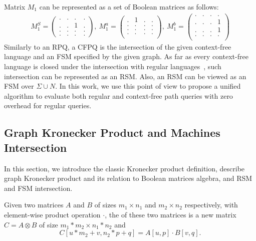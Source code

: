 Matrix $M_1$ can be represented as a set of Boolean matrices as follows:
{\small
\begin{align*}
M_1^S =
\begin{pmatrix}
    . & . & . & .   \\
    . & . & 1 & .   \\
    . & . & . & .   \\
    . & . & . & .
\end{pmatrix},~M_1^a =
\begin{pmatrix}
   . & 1 & . & .   \\
   . & . & . & .   \\
   . & . & . & .   \\
   . & . & . & .   \\
\end{pmatrix},~M_1^b =
\begin{pmatrix}
    . & . & . & .   \\
    . & . & . & 1   \\
    . & . & . & 1   \\
    . & . & . & .   \\
\end{pmatrix}
\end{align*}
}
Similarly to an RPQ, a CFPQ is the intersection of the given context-free language and an FSM specified by the given graph.
As far as every context-free language is closed under the intersection with regular languages~\citep{automata:theory:10.5555/1177300}, such intersection can be represented as an RSM.
Also, an RSM can be viewed as an FSM over $\Sigma \cup N$.
In this work, we use this point of view to propose a unified algorithm to evaluate both regular and context-free path queries with zero overhead for regular queries.

\subsection{Graph Kronecker Product and Machines Intersection}

In this section, we introduce the classic Kronecker product definition,
describe graph Kronecker product and its relation to Boolean matrices algebra,
and RSM and FSM intersection.

\begin{definition}
Given two matrices $A$ and $B$ of sizes $m_1 \times n_1$ and $m_2 \times n_2$
respectively, with element-wise product operation $\cdot$, the  of these two matrices is a new matrix $C = A \otimes B$ of size $m_1 * m_2 \times n_1 * n_2$ and \[C[u * m_2 + v,n_2 * p + q] = A[u,p] \cdot B[v,q].\]
\end{definition}

